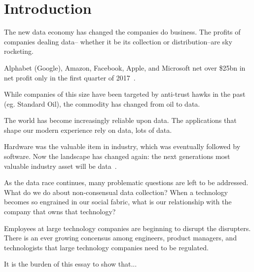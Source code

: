 \section{Introduction}

The new data economy has changed the companies do business. The profits of
companies dealing data-- whether it be its collection or distribution--are sky
rocketing.

Alphabet (Google), Amazon, Facebook, Apple, and Microsoft net over \$25bn in
net profit only in the first quarter of 2017~\cite{economist2017}.

While companies of this size have been targeted by anti-trust hawks in the past
(eg. Standard Oil), the commodity has changed from oil to data.

The world has become increasingly reliable upon data. The applications that
shape our modern experience rely on data, lots of data.

Hardware was the valuable item in industry, which was eventually followed by
software. Now the landscape has changed again: the next generations most
valuable industry asset will be data~\cite{janeway2018doing}.

As the data race continues, many problematic questions are left to be
addressed.  What do we do about non-consensual data collection? When a
technology becomes so engrained in our social fabric, what is our relationship
with the company that owns that technology?

Employees at large technology companies are beginning to disrupt the disrupters.
There is an ever growing concensus among engineers, product managers, and technologists
that large technology companies need to be regulated.

It is the burden of this essay to show that...
